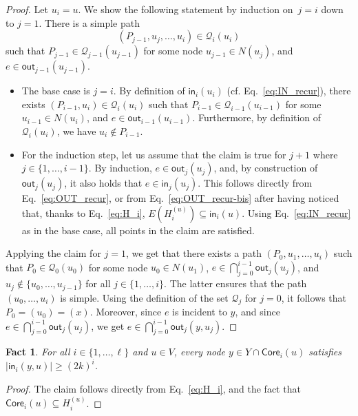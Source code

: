 \documentclass{article}
\newcommand{\F}{{\mathsf{out}}}
\renewcommand{\H}{{\mathsf{in}}}
\newcommand{\tp}{Y}
\newtheorem{fact}{Fact}
\begin{document}
\begin{proof}    
    Let $u_i=u$. We show the following statement by induction on~$j=i$ down to $j=1$. There is a simple path \[(P_{j-1},u_j,\dots,u_i)\in \mathcal{Q}_i(u_i)\] such that $P_{j-1}\in \mathcal{Q}_{j-1}(u_{j-1})$ for some node $u_{j-1}\in N(u_j)$, and $e\in \F_{j-1}(u_{j-1})$.
    
    \begin{itemize}
        \item The base case is $j=i$. By definition of $\H_i(u_i)$ (cf. Eq.~\eqref{eq:IN_recur}), there exists $(P_{i-1},u_i)\in \mathcal{Q}_i(u_i)$ such that $P_{i-1}\in \mathcal{Q}_{i-1}(u_{i-1})$ for some $u_{i-1}\in N(u_i)$, and $e\in\F_{i-1}(u_{i-1})$. Furthermore, by definition of $\mathcal{Q}_i(u_i)$, we have $u_i\notin P_{i-1}$.
    
        \item For the induction step, let us assume that the claim is true for $j+1$ where $j\in\{1,\dots,i-1\}$. By induction, $e\in \F_j(u_j)$, and, by construction of $\F_j(u_j)$, it also holds that $e\in \H_j(u_j)$. This follows directly from Eq.~\eqref{eq:OUT_recur}, or from Eq.~\eqref{eq:OUT_recur-bis} after having noticed that, thanks to Eq.~\eqref{eq:H_i}, $E(H_i^{(u)})\subseteq \H_i(u)$.         
        Using Eq.~\eqref{eq:IN_recur} as in the base case, all points in the claim are satisfied.
    \end{itemize}
Applying the claim for $j=1$, we get that there exists a path $(P_0,u_1,\dots,u_i)$ such that $P_0\in \mathcal{Q}_0(u_0)$ for some node $u_0\in N(u_1)$, $e\in \bigcap_{j=0}^{i-1}\F_j(u_j)$, and $u_j\notin \{u_0,\dots,u_{j-1}\}$ for all $j\in\{1,\dots,i\}$.
    The latter ensures that the path $(u_0,\dots,u_i)$ is simple. Using the definition of the set $\mathcal{Q}_j$ for $j=0$, it follows that $P_0=(u_0)=(x)$. 
    Moreover, since $e$ is incident to $y$, and since $e\in \bigcap_{j=0}^{i-1}\F_j(u_j)$, we get    
    $e\in \bigcap_{j=0}^{i-1}\F_j(y,u_j)$.
\end{proof}

\begin{fact}\label{fact:deg_F}
    For all $i\in\{1,\dots,\ell\}$ and $u\in V$, every node $y \in \tp \cap \mathsf{Core}_i(u)$ satisfies $|\H_i(y,u)|\geq (2k)^i$.
\end{fact}

\begin{proof}
    The claim follows directly from Eq.~\eqref{eq:H_i}, and the fact that $\mathsf{Core}_i(u)\subseteq H^{(u)}_i$.
\end{proof}
\end{document}
